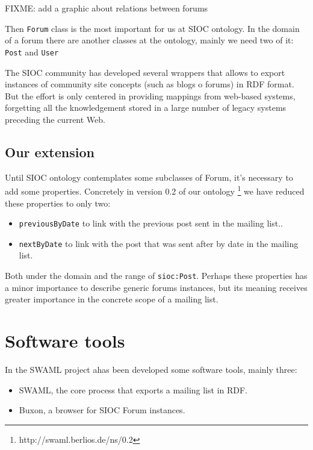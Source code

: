 \documentclass{llncs}
\begin{document}
FIXME: add a graphic about relations between forums

Then \texttt{Forum} class is the most important for us at SIOC ontology. 
In the domain of a forum there are another classes at the ontology, mainly 
we need two of it: \texttt{Post} and \texttt{User} 

The SIOC community has developed several wrappers that allows to export 
instances of community site concepts (such as blogs o forums) in RDF format. 
But the effort is only centered in providing mappings from web-based systems, 
forgetting all the knowledgement stored in a large number of legacy systems 
preceding the current Web.

\subsection{Our extension}

Until SIOC ontology contemplates some subclasses of Forum, it's necessary 
to add some properties. Concretely in version 0.2 of our ontology 
\footnote{http://swaml.berlios.de/ns/0.2} we have reduced these properties 
to only two:

\begin{itemize}
  \item \texttt{previousByDate} to link with the previous post sent 
	in the mailing list..
  \item \texttt{nextByDate} to link with the post that was sent after 
	by date in the mailing list.
\end{itemize}

Both under the domain and the range of \texttt{sioc:Post}. Perhaps 
these properties has a minor importance to describe generic forums 
instances, but its meaning receives greater importance in the concrete 
scope of a mailing list.

\section{\label{sec:tools}Software tools}

In the SWAML project ahas been developed some software tools, mainly 
three:

\begin{itemize}
 \item SWAML, the core process that exports a mailing list in RDF.
 \item Buxon, a browser for SIOC Forum instances.
\end{itemize}
\end{document}
